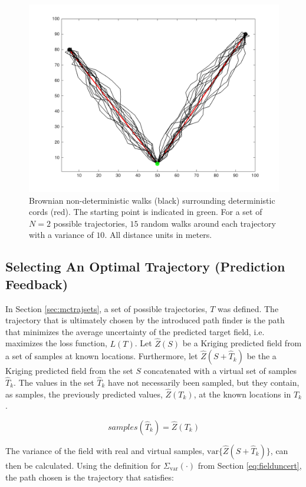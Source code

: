 \begin{figure}[h!]
	\centering
	\includegraphics[width=0.8\linewidth]{figures/brownian_motion_mc.png}
	\caption{Brownian non-deterministic walks (black) surrounding deterministic cords (red). The starting point is indicated in green. For a set of $N=2$ possible trajectories, $15$ random walks around each trajectory with a variance of $10$. All distance units in meters.}
\end{figure}

\subsection{Selecting An Optimal Trajectory (Prediction Feedback)} \label{sec:mcselbesttraj}
In Section \ref{sec:mctrajsets}, a set of possible trajectories, $T$ was defined. The trajectory that is ultimately chosen by the introduced path finder is the path that minimizes the average uncertainty of the predicted target field, i.e. maximizes the loss function, $L(T)$.
Let $\hat{Z}(S)$ be a Kriging predicted field from a set of samples at known locations. Furthermore, let $\hat{Z}(S+\hat{T}_k)$ be the a Kriging predicted field from the set $S$ concatenated with a virtual set of samples $\hat{T}_k$. The values in the set $\hat{T}_k$ have not necessarily been sampled, but they contain, as samples, the previously predicted values, $\hat{Z}(T_k)$, at the known locations in $T_k$.

\begin{equation}
	samples(\hat{T}_k) = \hat{Z}(T_k)
\end{equation}

The variance of the field with real and virtual samples, $\text{var}\{\hat{Z}(S+\hat{T}_k)\}$, can then be calculated. Using the definition for $\Sigma_{\text{var}}(\cdot)$ from Section \ref{eq:fielduncert}, the path chosen is the trajectory that satisfies:

